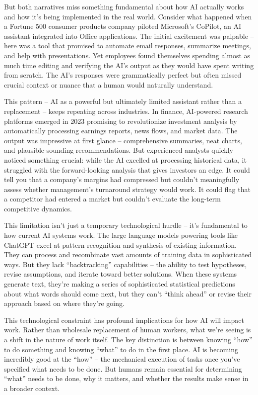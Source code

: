 \documentclass[
  Letterpaper,
]{scrbook}
\begin{document}
But both narratives miss something fundamental about how AI actually
works and how it's being implemented in the real world. Consider what
happened when a Fortune 500 consumer products company piloted
Microsoft's CoPilot, an AI assistant integrated into Office
applications. The initial excitement was palpable -- here was a tool
that promised to automate email responses, summarize meetings, and help
with presentations. Yet employees found themselves spending almost as
much time editing and verifying the AI's output as they would have spent
writing from scratch. The AI's responses were grammatically perfect but
often missed crucial context or nuance that a human would naturally
understand.

This pattern -- AI as a powerful but ultimately limited assistant rather
than a replacement -- keeps repeating across industries. In finance,
AI-powered research platforms emerged in 2023 promising to revolutionize
investment analysis by automatically processing earnings reports, news
flows, and market data. The output was impressive at first glance --
comprehensive summaries, neat charts, and plausible-sounding
recommendations. But experienced analysts quickly noticed something
crucial: while the AI excelled at processing historical data, it
struggled with the forward-looking analysis that gives investors an
edge. It could tell you that a company's margins had compressed but
couldn't meaningfully assess whether management's turnaround strategy
would work. It could flag that a competitor had entered a market but
couldn't evaluate the long-term competitive dynamics.

This limitation isn't just a temporary technological hurdle -- it's
fundamental to how current AI systems work. The large language models
powering tools like ChatGPT excel at pattern recognition and synthesis
of existing information. They can process and recombinate vast amounts
of training data in sophisticated ways. But they lack ``backtracking''
capabilities -- the ability to test hypotheses, revise assumptions, and
iterate toward better solutions. When these systems generate text,
they're making a series of sophisticated statistical predictions about
what words should come next, but they can't ``think ahead'' or revise
their approach based on where they're going.

This technological constraint has profound implications for how AI will
impact work. Rather than wholesale replacement of human workers, what
we're seeing is a shift in the nature of work itself. The key
distinction is between knowing ``how'' to do something and knowing
``what'' to do in the first place. AI is becoming incredibly good at the
``how'' -- the mechanical execution of tasks once you've specified what
needs to be done. But humans remain essential for determining ``what''
needs to be done, why it matters, and whether the results make sense in
a broader context.
\end{document}
